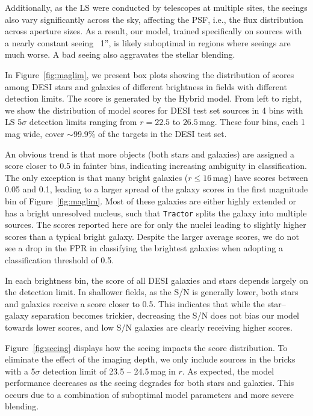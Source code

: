 \documentclass[twocolumn,tighten]{aastex631}
\begin{document}
\begin{CJK*}{UTF8}{gbsn}
Additionally, as the LS were conducted by telescopes at multiple sites, the seeings also vary significantly across the sky, affecting the PSF, i.e., the flux distribution across aperture sizes. As a result, our model, trained specifically on sources with a nearly constant seeing ~1'', is likely suboptimal in regions where seeings are much worse. A bad seeing also aggravates the stellar blending. 


In Figure~\ref{fig:maglim}, we present box plots showing the distribution of scores among DESI stars and galaxies of different brightness in fields with different detection limits. The score is generated by the Hybrid model. From left to right, we show the distribution of model scores for DESI test set sources in 4 bins with LS 5$\sigma$ detection limits ranging from $r = 22.5$ to $26.5$\,mag. These four bins, each 1\,mag wide, cover $\sim$99.9\% of the targets in the DESI test set. 

An obvious trend is that more objects (both stars and galaxies) are assigned a score closer to 0.5 in fainter bins, indicating increasing ambiguity in classification. {The only exception is that many bright galaxies ($r\le16$\,mag) have scores between 0.05 and 0.1, leading to a larger spread of the galaxy scores in the first magnitude bin of Figure~\ref{fig:maglim}.} Most of these galaxies are {either} highly extended {or has a bright unresolved nucleus, such that} \texttt{Tractor} splits the galaxy into {multiple sources}. The scores reported here are for only the nuclei leading to slightly higher scores than a typical bright galaxy. {Despite the larger average scores, we do not see a drop in the FPR in classifying the brightest galaxies when adopting a classification threshold of 0.5.}

In each brightness bin, the score of all DESI galaxies and stars depends largely on the detection limit. In shallower fields, as the S/N is generally lower, both stars and galaxies receive a score closer to 0.5. This indicates that while the star--galaxy separation becomes trickier, decreasing the S/N does not bias our model towards lower scores, and low S/N galaxies are clearly receiving higher scores. 

{Figure~\ref{fig:seeing} displays how the seeing impacts the score distribution. To eliminate the effect of the imaging depth, we only include sources in the bricks with a 5$\sigma$ detection limit of 23.5 -- 24.5\,mag in $r$. As expected, the model performance decreases as the seeing degrades for both stars and galaxies. This occurs due to a combination of suboptimal model parameters and more severe blending.}


\end{CJK*}
\end{document}
